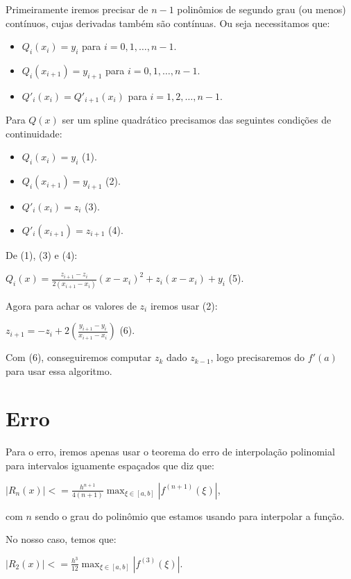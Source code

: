 \documentclass[12pt]{article}
\begin{document}
Primeiramente iremos precisar de $n-1$ polinômios de segundo grau (ou menos) contínuos, cujas derivadas também são contínuas. Ou seja necessitamos que:

\begin{itemize}
  
\item $Q_i(x_i) = y_i$ para $i = 0, 1, \dots, n-1$.
  
\item $Q_i(x_{i+1}) = y_{i+1}$ para $i = 0, 1, \dots, n-1$.
  
\item $Q'_i(x_i) = Q'_{i+1}(x_i)$ para $i = 1, 2, \dots, n-1$.
  
\end{itemize}

Para $Q(x)$ ser um spline quadrático precisamos das seguintes condições de continuidade:

\begin{itemize}
  
\item $Q_i(x_i) = y_i$ (1).
  
\item $Q_i(x_{i+1}) = y_{i+1}$ (2).
  
\item $Q'_i(x_i) = z_i$ (3).
  
\item $Q'_i(x_{i+1}) = z_{i+1}$ (4).
  
\end{itemize}

De (1), (3) e (4):

$Q_i(x) = \frac{z_{i+1}-z_{i}}{2(x_{i+1}-x_i)}(x-x_i)^2+z_i(x-x_i)+y_i$ (5).

Agora para achar os valores de $z_i$ iremos usar (2):

$z_{i+1} = -z_i + 2(\frac{y_{i+1}-y_i}{x_{i+1}-x_i})$ (6).

Com (6), conseguiremos computar $z_k$ dado $z_{k-1}$, logo precisaremos do $f'(a)$ para usar essa algoritmo.

\section{Erro}

Para o erro, iremos apenas usar o teorema do erro de interpolação polinomial para intervalos iguamente espaçados que diz que:

$|R_n(x)| <= \frac{h^{n+1}}{4(n+1)}\displaystyle\max_{\xi \in [a,b]}|f^{(n+1)}(\xi) |$,

com $n$ sendo o grau do polinômio que estamos usando para interpolar a função.

\noindent No nosso caso, temos que:

$|R_2(x)| <= \frac{h^{3}}{12}\displaystyle\max_{\xi \in [a,b]}|f^{(3)}(\xi) |$.
\end{document}

